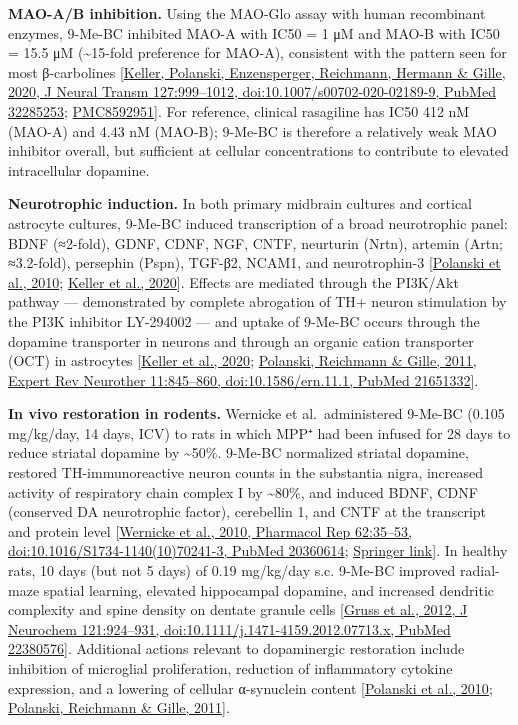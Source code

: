 \textbf{MAO-A/B inhibition.} Using the MAO-Glo assay with human recombinant enzymes, 9-Me-BC inhibited MAO-A with IC50 = 1 μM and MAO-B with IC50 = 15.5 μM (\textasciitilde15-fold preference for MAO-A), consistent with the pattern seen for most β-carbolines {[}\href{https://pubmed.ncbi.nlm.nih.gov/32285253/}{Keller, Polanski, Enzensperger, Reichmann, Hermann \& Gille, 2020, J Neural Transm 127:999--1012, doi:10.1007/s00702-020-02189-9, PubMed 32285253}; \href{https://pmc.ncbi.nlm.nih.gov/articles/PMC8592951/}{PMC8592951}{]}. For reference, clinical rasagiline has IC50 412 nM (MAO-A) and 4.43 nM (MAO-B); 9-Me-BC is therefore a relatively weak MAO inhibitor overall, but sufficient at cellular concentrations to contribute to elevated intracellular dopamine.

\textbf{Neurotrophic induction.} In both primary midbrain cultures and cortical astrocyte cultures, 9-Me-BC induced transcription of a broad neurotrophic panel: BDNF (≈2-fold), GDNF, CDNF, NGF, CNTF, neurturin (Nrtn), artemin (Artn; ≈3.2-fold), persephin (Pspn), TGF-β2, NCAM1, and neurotrophin-3 {[}\href{https://pubmed.ncbi.nlm.nih.gov/20374418/}{Polanski et al., 2010}; \href{https://pubmed.ncbi.nlm.nih.gov/32285253/}{Keller et al., 2020}{]}. Effects are mediated through the PI3K/Akt pathway --- demonstrated by complete abrogation of TH+ neuron stimulation by the PI3K inhibitor LY-294002 --- and uptake of 9-Me-BC occurs through the dopamine transporter in neurons and through an organic cation transporter (OCT) in astrocytes {[}\href{https://pmc.ncbi.nlm.nih.gov/articles/PMC8592951/}{Keller et al., 2020}; \href{https://pubmed.ncbi.nlm.nih.gov/21651332/}{Polanski, Reichmann \& Gille, 2011, Expert Rev Neurother 11:845--860, doi:10.1586/ern.11.1, PubMed 21651332}{]}.

\textbf{In vivo restoration in rodents.} Wernicke et al.~administered 9-Me-BC (0.105 mg/kg/day, 14 days, ICV) to rats in which MPP⁺ had been infused for 28 days to reduce striatal dopamine by \textasciitilde50\%. 9-Me-BC normalized striatal dopamine, restored TH-immunoreactive neuron counts in the substantia nigra, increased activity of respiratory chain complex I by \textasciitilde80\%, and induced BDNF, CDNF (conserved DA neurotrophic factor), cerebellin 1, and CNTF at the transcript and protein level {[}\href{https://pubmed.ncbi.nlm.nih.gov/20360614/?dopt=Abstract}{Wernicke et al., 2010, Pharmacol Rep 62:35--53, doi:10.1016/S1734-1140(10)70241-3, PubMed 20360614}; \href{https://link.springer.com/article/10.1016/S1734-1140(10)70241-3}{Springer link}{]}. In healthy rats, 10 days (but not 5 days) of 0.19 mg/kg/day s.c. 9-Me-BC improved radial-maze spatial learning, elevated hippocampal dopamine, and increased dendritic complexity and spine density on dentate granule cells {[}\href{https://pubmed.ncbi.nlm.nih.gov/22380576/}{Gruss et al., 2012, J Neurochem 121:924--931, doi:10.1111/j.1471-4159.2012.07713.x, PubMed 22380576}{]}. Additional actions relevant to dopaminergic restoration include inhibition of microglial proliferation, reduction of inflammatory cytokine expression, and a lowering of cellular α-synuclein content {[}\href{https://pubmed.ncbi.nlm.nih.gov/20374418/}{Polanski et al., 2010}; \href{https://pubmed.ncbi.nlm.nih.gov/21651332/}{Polanski, Reichmann \& Gille, 2011}{]}.


